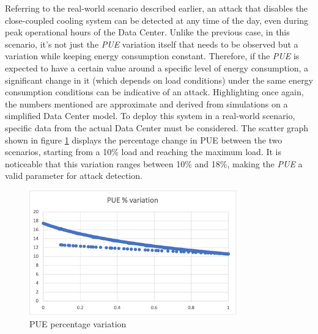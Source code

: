 Referring to the real-world scenario described earlier, an attack that disables the close-coupled cooling system can be detected at any time of the day, even during peak operational hours of the Data Center. Unlike the previous case, in this scenario, it's not just the \emph{PUE} variation itself that needs to be observed but a variation while keeping energy consumption constant. Therefore, if the \emph{PUE} is expected to have a certain value around a specific level of energy consumption, a significant change in it (which depends on load conditions) under the same energy consumption conditions can be indicative of an attack. Highlighting once again, the numbers mentioned are approximate and derived from simulations on a simplified Data Center model. To deploy this system in a real-world scenario, specific data from the actual Data Center must be considered. The scatter graph shown in figure \ref{fig:pue_variation_cooling} displays the percentage change in PUE between the two scenarios, starting from a 10\% load and reaching the maximum load. It is noticeable that this variation ranges between 10\% and 18\%, making the \emph{PUE} a valid parameter for attack detection.

\begin{figure}[h]
    \centering
    \includegraphics[width=0.8\textwidth]{chapters/images/pue_variation_cooling.png}
    \caption{PUE percentage variation}
    \label{fig:pue_variation_cooling}
\end{figure}


